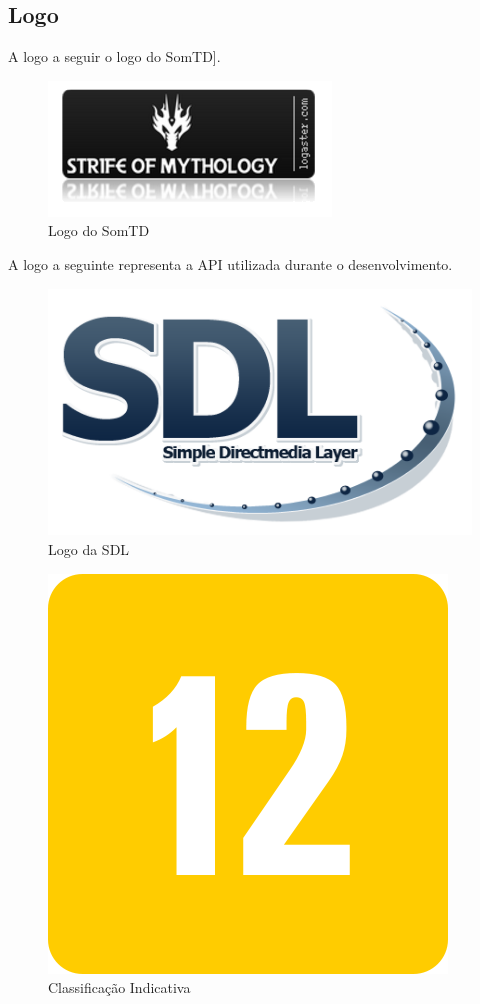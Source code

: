 \documentclass[11pt]{article} %
\begin{document}
\newpage
\subsection{Logo}

A logo a seguir o logo do SomTD].
\begin{figure}[!htp]
\centering
\includegraphics[scale=1.1]{res/logo.png}
\caption{Logo do SomTD}
\label{Logo do SomTD}
\end{figure}

A logo a seguinte representa a API utilizada durante o desenvolvimento.

\begin{figure}[!htp]
\centering
\includegraphics[scale=0.3]{res/Sdl-logo.png}
\caption{Logo da SDL}
\label{Logo da SDL}
\end{figure}

\begin{figure}[!htp]
\centering
\includegraphics[scale=0.3]{res/classification.png}
\caption{Classificação Indicativa}
\label{Classificação Indicativa}
\end{figure}
\end{document}
